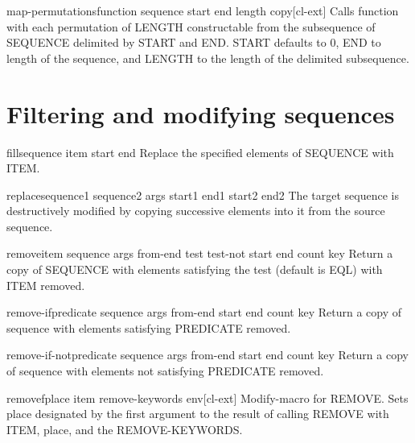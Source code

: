 \documentclass[10pt,english]{book}
\begin{document}
\begin{function}{map-permutations}{function sequence \key start end length copy}[cl-ext]
  Calls function with each permutation of LENGTH constructable
  from the subsequence of SEQUENCE delimited by START and END. START
  defaults to 0, END to length of the sequence, and LENGTH to the
  length of the delimited subsequence.
\end{function}

\section{Filtering and modifying sequences}
\label{sec:filt-modify-sequ}

\begin{function}{fill}{sequence item \key start end}
  Replace the specified elements of SEQUENCE with ITEM.
\end{function}

\begin{function}{replace}{sequence1 sequence2 \rest args \key start1 end1 start2 end2}
  The target sequence is destructively modified by copying successive
  elements into it from the source sequence.
\end{function}

\begin{function}{remove}{item sequence \rest args \key from-end test test-not start end count key}
  Return a copy of SEQUENCE with elements satisfying the test (default is
  EQL) with ITEM removed.
\end{function}

\begin{function}{remove-if}{predicate sequence \rest args \key from-end start end count key}
  Return a copy of sequence with elements satisfying PREDICATE removed.
\end{function}

\begin{function}{remove-if-not}{predicate sequence \rest args \key from-end start end count key}
  Return a copy of sequence with elements not satisfying PREDICATE removed.
\end{function}

\begin{macro}{removef}{place item \rest remove-keywords \env env}[cl-ext]
  Modify-macro for REMOVE. Sets place designated by the first argument
  to the result of calling REMOVE with ITEM, place, and the
  REMOVE-KEYWORDS.
\end{macro}
\end{document}
